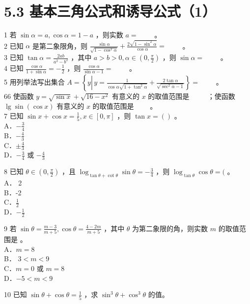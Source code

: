\documentclass[10pt]{article}
\begin{document}
\section*{5.3 基本三角公式和诱导公式（1）}
1 若 \(\sin \alpha=a, \cos \alpha=1-a\) ，则实数 \(a=\) \(\qquad\)。\\
2 已知 \(\alpha\) 是第二象限角，则 \(\frac{\sin \alpha}{\sqrt{1-\cos ^{2} \alpha}}+\frac{2 \sqrt{1-\sin ^{2} \alpha}}{\cos \alpha}=\) \(\qquad\)。\\
3 已知 \(\tan \alpha=\frac{2 a b}{a^{2}-b^{2}}\) ，其中 \(a>b>0, \alpha \in\left(0, \frac{\pi}{2}\right)\) ，则 \(\sin \alpha=\) \(\qquad\)。\\
4 已知 \(\frac{\cos \alpha}{1+\sin \alpha}=-\frac{1}{2}\) ，则 \(\frac{\cos \alpha}{\sin \alpha-1}=\) \(\qquad\)。\\
5 用列举法写出集合 \(A=\left\{y \left\lvert\, y=\frac{1}{\cos \alpha \sqrt{1+\tan ^{2} \alpha}}+\frac{2 \tan \alpha}{\sqrt{\sec ^{2} \alpha-1}}\right.\right\}=\) \(\qquad\)。\\
66 使函数 \(y=\sqrt{\sin x}+\sqrt{16-x^{2}}\) 有意义的 \(x\) 的取值范围是 \(\qquad\) ；使函数 \(\lg \sin (\cos x)\) 有意义的 \(x\) 的取值范围是 \(\qquad\)。\\
7 已知 \(\sin x+\cos x=\frac{1}{5}, x \in[0, \pi]\) ，则 \(\tan x=()\) 。\\
A．\(-\frac{3}{4}\)\\
B．\(-\frac{4}{3}\)\\
C．\(\pm \frac{4}{3}\)\\
D．\(-\frac{3}{4}\) 或 \(-\frac{4}{3}\)

8 已知 \(\theta \in\left(0, \frac{\pi}{2}\right)\) ，且 \(\log _{\tan \theta+\cot \theta} \sin \theta=-\frac{3}{4}\) ，则 \(\log _{\tan \theta} \cos \theta=(\) 。\\
A． 2\\
B．-2\\
C．\(\frac{1}{2}\)\\
D．\(-\frac{1}{2}\)

9 若 \(\sin \theta=\frac{m-3}{m+5}, \cos \theta=\frac{4-2 m}{m+5}\) ，其中 \(\theta\) 为第二象限的角，则实数 \(m\) 的取值范围是 。\\
A．\(m=8\)\\
B． \(3<m<9\)\\
C．\(m=0\) 或 \(m=8\)\\
D．\(-5<m<9\)

10 已知 \(\sin \theta+\cos \theta=\frac{1}{5}\) ，求 \(\sin ^{3} \theta+\cos ^{3} \theta\) 的值。
\end{document}
